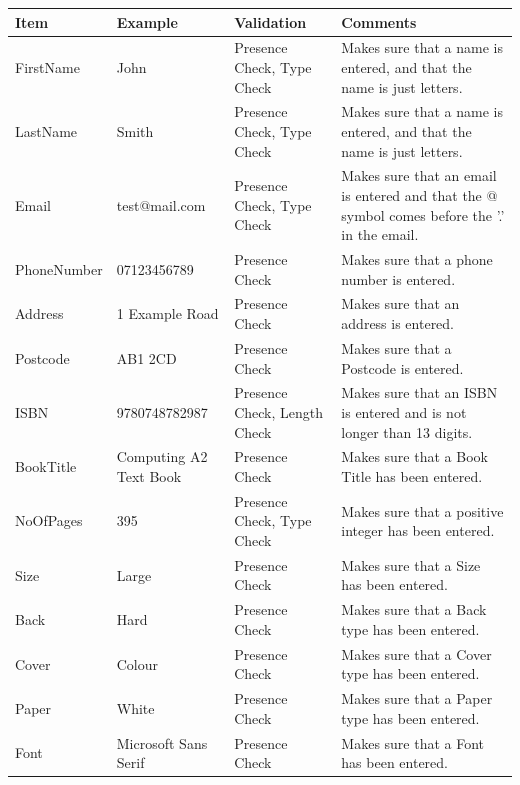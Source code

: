 \begin{center}
    \begin{tabular}{|p{2cm}|p{2cm}|p{2cm}|p{3cm}|}
    \textbf{Item} & \textbf{Example} & \textbf{Validation} & \textbf{Comments}\\ \hline
    FirstName & John & Presence Check, Type Check & Makes sure that a name is entered, and that the name is just letters. \\ \hline
    LastName & Smith & Presence Check, Type Check & Makes sure that a name is entered, and that the name is just letters. \\ \hline
    Email & test@mail.com & Presence Check, Type Check & Makes sure that an email is entered and that the @ symbol comes before the '.' in the email. \\ \hline
    PhoneNumber & 07123456789 & Presence Check & Makes sure that a phone number is entered. \\ \hline
    Address & 1 Example Road & Presence Check & Makes sure that an address is entered. \\ \hline
    Postcode & AB1 2CD & Presence Check & Makes sure that a Postcode is entered. \\ \hline
    ISBN & 9780748782987 & Presence Check, Length Check & Makes sure that an ISBN is entered and is not longer than 13 digits. \\ \hline
    BookTitle & Computing A2 Text Book & Presence Check & Makes sure that a Book Title has been entered. \\ \hline
    NoOfPages & 395 & Presence Check, Type Check & Makes sure that a positive integer has been entered. \\ \hline
    Size & Large & Presence Check & Makes sure that a Size has been entered. \\ \hline
    Back & Hard & Presence Check & Makes sure that a Back type has been entered. \\ \hline
    Cover & Colour & Presence Check & Makes sure that a Cover type has been entered. \\ \hline
    Paper & White & Presence Check & Makes sure that a Paper type has been entered. \\ \hline
    Font & Microsoft Sans Serif & Presence Check & Makes sure that a Font has been entered. \\ \hline
\end{tabular}
\end{center}

